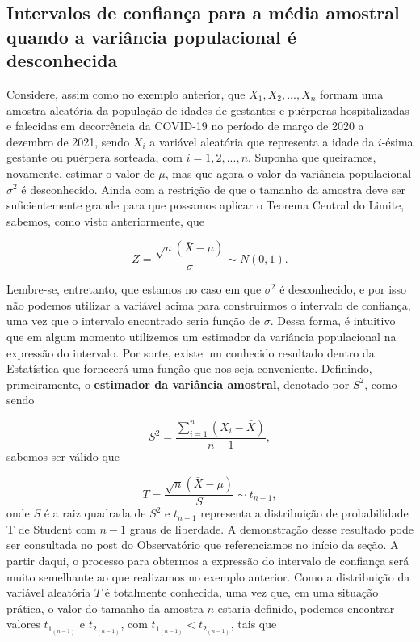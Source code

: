 \documentclass[
  letterpaper,
  DIV=11,
  numbers=noendperiod]{scrreprt}
\begin{document}
\hypertarget{intervalos-de-confianuxe7a-para-a-muxe9dia-amostral-quando-a-variuxe2ncia-populacional-uxe9-desconhecida}{%
\subsection{Intervalos de confiança para a média amostral quando a
variância populacional é
desconhecida}\label{intervalos-de-confianuxe7a-para-a-muxe9dia-amostral-quando-a-variuxe2ncia-populacional-uxe9-desconhecida}}

Considere, assim como no exemplo anterior, que \(X_1, X_2, ..., X_n\)
formam uma amostra aleatória da população de idades de gestantes e
puérperas hospitalizadas e falecidas em decorrência da COVID-19 no
período de março de 2020 a dezembro de 2021, sendo \(X_i\) a variável
aleatória que representa a idade da \(i\)-ésima gestante ou puérpera
sorteada, com \(i = 1, 2, ..., n\). Suponha que queiramos, novamente,
estimar o valor de \(\mu\), mas que agora o valor da variância
populacional \(\sigma^2\) é desconhecido. Ainda com a restrição de que o
tamanho da amostra deve ser suficientemente grande para que possamos
aplicar o Teorema Central do Limite, sabemos, como visto anteriormente,
que

\[
Z  = \frac{\sqrt{n}\left(\bar{X} - \mu\right)}{\sigma} \sim N(0, 1).
\]

Lembre-se, entretanto, que estamos no caso em que \(\sigma^2\) é
desconhecido, e por isso não podemos utilizar a variável acima para
construirmos o intervalo de confiança, uma vez que o intervalo
encontrado seria função de \(\sigma\). Dessa forma, é intuitivo que em
algum momento utilizemos um estimador da variância populacional na
expressão do intervalo. Por sorte, existe um conhecido resultado dentro
da Estatística que fornecerá uma função que nos seja conveniente.
Definindo, primeiramente, o \textbf{estimador da variância amostral},
denotado por \(S^2\), como sendo

\[
S^2 = \frac{\sum_{i = 1}^n (X_i - \bar{X})}{n - 1},
\] sabemos ser válido que

\[
T = \frac{\sqrt{n} \left(\bar{X} - \mu \right)}{S} \sim t_{n - 1},
\] onde \(S\) é a raiz quadrada de \(S^2\) e \(t_{n - 1}\) representa a
distribuição de probabilidade T de Student com \(n - 1\) graus de
liberdade. A demonstração desse resultado pode ser consultada no post do
Observatório que referenciamos no início da seção. A partir daqui, o
processo para obtermos a expressão do intervalo de confiança será muito
semelhante ao que realizamos no exemplo anterior. Como a distribuição da
variável aleatória \(T\) é totalmente conhecida, uma vez que, em uma
situação prática, o valor do tamanho da amostra \(n\) estaria definido,
podemos encontrar valores \(t_{1_{(n-1)}}\) e \(t_{2_{(n-1)}}\), com
\(t_{1_{(n-1)}} < t_{2_{(n-1)}}\), tais que
\end{document}
